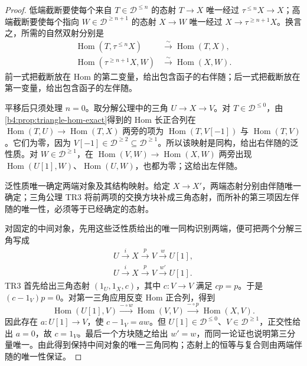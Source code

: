 \begin{proof}
	低端截断要使每个来自 \(T\in\mathcal D^{\le n}\) 的态射 \(T\to X\) 唯一经过 \(\tau^{\le n}X\to X\)；高端截断要使每个指向 \(W\in\mathcal D^{\ge n+1}\) 的态射 \(X\to W\) 唯一经过 \(X\to\tau^{\ge n+1}X\)。换言之，所需的自然双射分别是
	\[
		\begin{aligned}
			\operatorname{Hom}(T,\tau^{\le n}X)&\xrightarrow{\sim}\operatorname{Hom}(T,X),\\
			\operatorname{Hom}(\tau^{\ge n+1}X,W)&\xrightarrow{\sim}\operatorname{Hom}(X,W).
		\end{aligned}
	\]
	前一式把截断放在 Hom 的第二变量，给出包含函子的右伴随；后一式把截断放在第一变量，给出包含函子的左伴随。

	平移后只须处理 \(n=0\)。取分解公理中的三角 \(U\to X\to V\)。对 \(T\in\mathcal D^{\le0}\)，由\cref{b4:prop:triangle-hom-exact}得到的 Hom 长正合列在 \(\operatorname{Hom}(T,U)\to\operatorname{Hom}(T,X)\) 两旁的项为 \(\operatorname{Hom}(T,V[-1])\) 与 \(\operatorname{Hom}(T,V)\)。它们为零，因为 \(V[-1]\in\mathcal D^{\ge2}\subseteq\mathcal D^{\ge1}\)。所以该映射是同构，给出右伴随的泛性质。对 \(W\in\mathcal D^{\ge1}\)，在 \(\operatorname{Hom}(V,W)\to\operatorname{Hom}(X,W)\) 两旁出现 \(\operatorname{Hom}(U[1],W)\)、\(\operatorname{Hom}(U,W)\)，也都为零；这给出左伴随。

	泛性质唯一确定两端对象及其结构映射。给定 \(X\to X'\)，两端态射分别由伴随唯一确定；三角公理 TR3 将前两项的交换方块补成三角态射，而所补的第三项因左伴随的唯一性，必须等于已经确定的态射。

	对固定的中间对象，先用这些泛性质给出的唯一同构识别两端，便可把两个分解三角写成
	\[
		\begin{gathered}
			U\xrightarrow{i}X\xrightarrow{p}V\xrightarrow{w}U[1],\\
			U\xrightarrow{i}X\xrightarrow{p}V\xrightarrow{w'}U[1].
		\end{gathered}
	\]
	TR3 首先给出三角态射 \((1_U,1_X,c)\)，其中 \(c:V\to V\) 满足 \(cp=p\)。于是 \((c-1_V)p=0\)。对第一三角应用反变 Hom 正合列，得到
	\[
		\operatorname{Hom}(U[1],V)\xrightarrow{-\circ w} \operatorname{Hom}(V,V)\xrightarrow{-\circ p}\operatorname{Hom}(X,V).
	\]
	因此存在 \(a:U[1]\to V\)，使 \(c-1_V=aw\)。但 \(U[1]\in\mathcal D^{\le0}\)、\(V\in\mathcal D^{\ge1}\)，正交性给出 \(a=0\)，故 \(c=1_V\)。最后一个方块随之给出 \(w'=w\)，而同一论证也说明第三分量唯一。由此得到保持中间对象的唯一三角同构；态射上的恒等与复合则由两端伴随的唯一性保证。
\end{proof}

